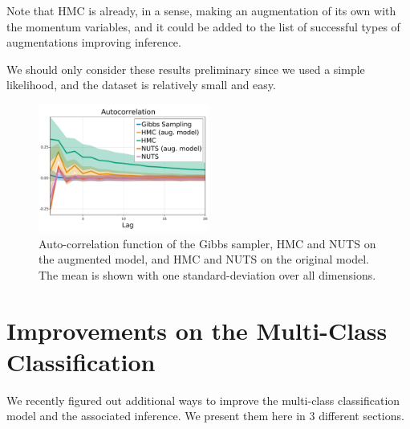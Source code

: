 Note that \ac{HMC} is already, in a sense, making an augmentation of its own with the momentum variables, and it could be added to the list of successful types of augmentations improving inference.

We should only consider these results preliminary since we used a simple likelihood, and the dataset is relatively small and easy.

\begin{figure}[H]
    \centering
    \includegraphics[width=0.5\textwidth]{./chapters/8_discussions/figures/autocorrelation.pdf}
    \caption{Auto-correlation function of the Gibbs sampler, \ac{HMC} and \ac{NUTS} on the augmented model, and \ac{HMC} and \ac{NUTS} on the original model.
    The mean is shown with one standard-deviation over all dimensions.}
    \label{fig:hmc_vs_gibbs}
\end{figure}

\section{Improvements on the Multi-Class Classification}
\label{sec:improvemulticlass}
We recently figured out additional ways to improve the multi-class classification model and the associated inference.
We present them here in 3 different sections.

